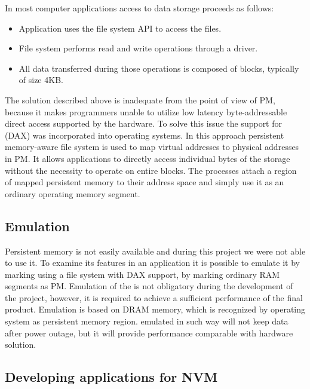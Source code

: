         In most computer applications access to data storage proceeds as follows:
        \begin{itemize}
            \item Application uses the file system API to access the files.
            \item File system performs read and write operations through a driver.
            \item All data transferred during those operations is composed of blocks, typically of size 4KB.
        \end{itemize}
        The solution described above is inadequate from the point of view of PM, because it makes programmers unable to utilize low latency byte-addressable direct access supported by the hardware.
        To solve this issue the support for \DAX (DAX) was incorporated into operating systems.
        In this approach persistent memory-aware file system is used to map virtual addresses to physical addresses in PM. 
        It allows applications to directly access individual bytes of the storage without the necessity to operate on entire blocks. The processes attach a region of mapped persistent memory to their address space and simply use it as an ordinary operating memory  segment.
      
    \subsection{Emulation}
        Persistent memory is not easily available and during this project we were not able to use it. 
        To examine its features in an application it is possible to emulate it by marking 
        using a file system with DAX support, by marking ordinary RAM segments as PM.\cite{PmemEmulation}
        Emulation of the \PM is not obligatory during the development of the project, however, it is required to achieve a sufficient performance of the final product. 
        Emulation is based on DRAM memory, which is recognized by operating system as persistent memory region.
        \PM emulated in such way will not keep data after power outage, but it will provide performance comparable with hardware solution.
        
    \subsection{Developing applications for NVM}
        
